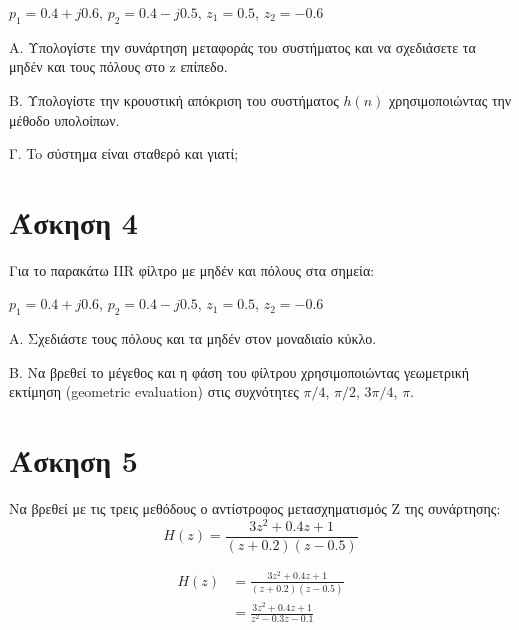 \documentclass[12pt]{turabian-researchpaper}
\begin{document}
\begin{center}
    $ p_1 = 0.4 + j0.6 $, $ p_2 = 0.4 - j0.5 $, $ z_1 = 0.5 $, $ z_2 = -0.6 $
\end{center}

A. Υπολογίστε την συνάρτηση μεταφοράς του συστήματος και να σχεδιάσετε τα μηδέν και τους πόλους στο z επίπεδο.

Β. Υπολογίστε την κρουστική απόκριση του συστήματος $h(n)$ χρησιμοποιώντας  την μέθοδο υπολοίπων.

Γ. To σύστημα είναι σταθερό και γιατί;

\section{Άσκηση 4}

Για το παρακάτω IIR φίλτρο με μηδέν και πόλους στα σημεία:

\begin{center}
    $ p_1 = 0.4 + j0.6 $, $ p_2 = 0.4 - j0.5 $, $ z_1 = 0.5 $, $ z_2 = -0.6 $
\end{center}

Α. Σχεδιάστε τους πόλους και τα μηδέν στον μοναδιαίο κύκλο.

Β. Να βρεθεί το μέγεθος και η φάση του φίλτρου χρησιμοποιώντας γεωμετρική εκτίμηση (geometric evaluation) στις συχνότητες $\pi/4$, $\pi/2$, $ 3\pi/4 $, $ \pi $.

\section{Άσκηση 5}

Να βρεθεί με τις τρεις μεθόδους ο αντίστροφος μετασχηματισμός Z της συνάρτησης: $$ H(z) = \frac{3 z^2 + 0.4 z + 1}{(z + 0.2)(z - 0.5)} $$

\begin{equation}
    \begin{aligned}
        H(z) & = \frac{3 z^2 + 0.4 z + 1}{(z + 0.2)(z - 0.5)} \\
             & = \frac{3 z^2 + 0.4 z + 1}{z^2 - 0.3 z - 0.1}  \\
    \end{aligned}
\end{equation}
\end{document}
